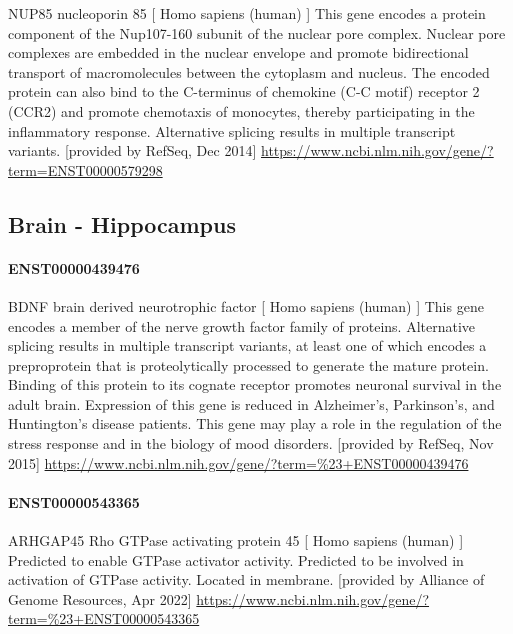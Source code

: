 \documentclass[
]{article}
\begin{document}
NUP85 nucleoporin 85 {[} Homo sapiens (human) {]} This gene encodes a
protein component of the Nup107-160 subunit of the nuclear pore complex.
Nuclear pore complexes are embedded in the nuclear envelope and promote
bidirectional transport of macromolecules between the cytoplasm and
nucleus. The encoded protein can also bind to the C-terminus of
chemokine (C-C motif) receptor 2 (CCR2) and promote chemotaxis of
monocytes, thereby participating in the inflammatory response.
Alternative splicing results in multiple transcript variants.
{[}provided by RefSeq, Dec 2014{]}
\url{https://www.ncbi.nlm.nih.gov/gene/?term=ENST00000579298}

\hypertarget{brain---hippocampus}{%
\subsection{Brain - Hippocampus}\label{brain---hippocampus}}

\hypertarget{enst00000439476}{%
\paragraph{ENST00000439476}\label{enst00000439476}}

BDNF brain derived neurotrophic factor {[} Homo sapiens (human) {]} This
gene encodes a member of the nerve growth factor family of proteins.
Alternative splicing results in multiple transcript variants, at least
one of which encodes a preproprotein that is proteolytically processed
to generate the mature protein. Binding of this protein to its cognate
receptor promotes neuronal survival in the adult brain. Expression of
this gene is reduced in Alzheimer's, Parkinson's, and Huntington's
disease patients. This gene may play a role in the regulation of the
stress response and in the biology of mood disorders. {[}provided by
RefSeq, Nov 2015{]}
\url{https://www.ncbi.nlm.nih.gov/gene/?term=\%23+ENST00000439476}

\hypertarget{enst00000543365}{%
\paragraph{ENST00000543365}\label{enst00000543365}}

ARHGAP45 Rho GTPase activating protein 45 {[} Homo sapiens (human) {]}
Predicted to enable GTPase activator activity. Predicted to be involved
in activation of GTPase activity. Located in membrane. {[}provided by
Alliance of Genome Resources, Apr 2022{]}
\url{https://www.ncbi.nlm.nih.gov/gene/?term=\%23+ENST00000543365}
\end{document}

